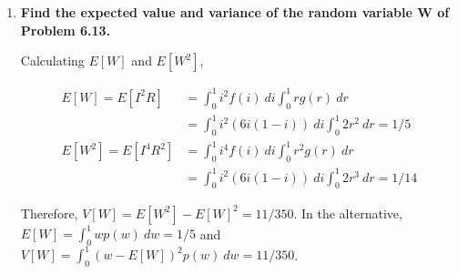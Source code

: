 \documentclass[10pt, oneside]{article}
\begin{document}
\begin{enumerate}[label=7.\arabic*]
  By independence of $I, X$, we can write
  
  \begin{align*}
  E \Big[ \frac{2I}{X} \Big] &= 2 \int^5_3 \frac{1}{x} f(x) \ dx \int^{20}_{10} i g(i) \ di \\
  &= 2 \int^5_3 \frac{1}{2x} \ dx \int^{20}_{10} \frac{i}{10} \ di = \boxed{15 \ln \Big( \frac{5}{3} \Big)}
  \end{align*}
  
  In the alternative, using the pdf for $H$ derived in 6.11
  
  \[ q(h) =
\begin{dcases}
 \frac{1600-9h^2}{80h^2}, \quad 8 < h < 40/3  \\
 \frac{5h^2 - 80}{16 h^2}, \quad 4 < h < 20/3 
\end{dcases}
\]

We may also find $E[H] = \int_H h q(h) \ dh = \boxed{15 \ln \Big( \frac{5}{3} \Big)}$. To calculate $E[H^2]$, we write

\begin{align*}
E[4I^2 / X^2] &= 4 \int^5_3 \frac{1}{x^2} f(x) \ dx \int^{20}_{10} i^2 g(i) \ di \\
&= 4 \int^5_3 \frac{1}{2x^2} \ dx \int^{20}_{10} \frac{i^2}{10} \ di = 560/9
\end{align*}

Allowing us to conclude $V[H] = E[H^2] - E[H]^2 \approx \boxed{3.51}$. Similarly, $V[H] = \int_H (h - E[H])^2 q(h) \ dh \approx \boxed{3.51}$.
  
\item  \begin{tcolorbox}[
  colback=Cerulean!5!white,
  colframe=Cerulean!75!black]
  \textbf{Find the expected value and variance of the random variable $\bm{W}$ of Problem 6.13.}
  \end{tcolorbox}
  
  Calculating $E[W]$ and $E[W^2]$,
  
  \begin{align*}
  E[W] = E[I^2 R] &= \int^1_0 i^2 f(i) \ di \int^1_0 r g(r) \ dr \\
  &= \int^1_0 i^2 (6i(1-i)) \ di \int^1_0 2r^2 \ dr = \boxed{1/5} \\
  E[W^2] = E[I^4 R^2] &= \int^1_0 i^4 f(i) \ di \int^1_0 r^2 g(r) \ dr \\
  &= \int^1_0 i^2 (6i(1-i)) \ di \int^1_0 2r^3 \ dr = 1/14
  \end{align*}
  
  Therefore, $V[W] = E[W^2] - E[W]^2 = \boxed{11/350}$. In the alternative, $E[W] = \int^1_0 w p(w) \ dw = \boxed{1/5}$ and $V[W] = \int^1_0 (w - E[W])^2 p(w) \ dw = \boxed{11/350}$.


\end{enumerate}
\end{document}

